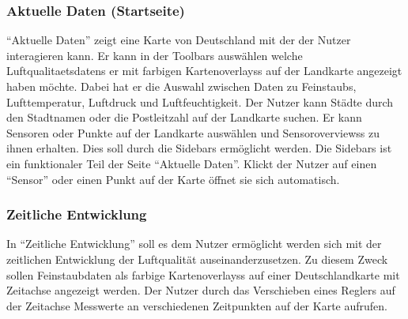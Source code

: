 \subsubsection{Aktuelle Daten (Startseite)}

\enquote{Aktuelle Daten} zeigt eine Karte von Deutschland mit der der Nutzer interagieren kann. 
Er kann in der \glspl{Toolbar} auswählen welche \glspl{Luftqualitaetsdaten} er mit farbigen \glspl{Kartenoverlay}s auf der Landkarte angezeigt haben möchte. 
Dabei hat er die Auswahl zwischen Daten zu \glspl{Feinstaub}, Lufttemperatur, Luftdruck und Luftfeuchtigkeit.
Der Nutzer kann Städte durch den Stadtnamen oder die Postleitzahl auf der Landkarte suchen. Er kann Sensoren oder Punkte auf der Landkarte auswählen und \glspl{Sensoroverview}s zu ihnen erhalten. Dies soll durch die \glspl{Sidebar} ermöglicht werden.
Die \glspl{Sidebar} ist ein funktionaler Teil der Seite \enquote{Aktuelle Daten}. Klickt der Nutzer auf einen \enquote{Sensor} oder einen Punkt auf der Karte öffnet sie sich automatisch.



\subsubsection{Zeitliche Entwicklung}

In \enquote{Zeitliche Entwicklung} soll es dem Nutzer ermöglicht werden sich mit der zeitlichen Entwicklung der Luftqualität auseinanderzusetzen. 
Zu diesem Zweck sollen Feinstaubdaten als farbige \glspl{Kartenoverlay}s auf einer Deutschlandkarte mit Zeitachse angezeigt werden. 
Der Nutzer durch das Verschieben eines Reglers auf der Zeitachse Messwerte an verschiedenen Zeitpunkten auf der Karte aufrufen.


